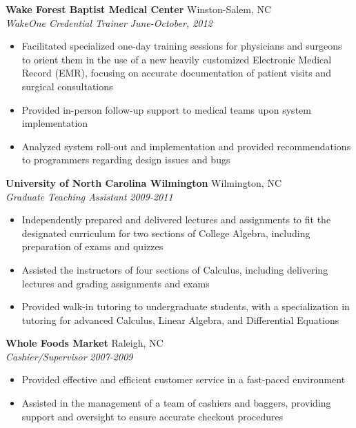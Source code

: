 \documentclass[10pt]{article}
\begin{document}
\noindent
{\bf Wake Forest Baptist Medical Center} \hfill Winston-Salem, NC\\
{\it WakeOne Credential Trainer} \hfill {\it June-October, 2012}

\begin{itemize}

\item Facilitated specialized one-day training sessions for physicians
and surgeons to orient them in the use of a new heavily customized Electronic
Medical Record (EMR), focusing on accurate documentation of patient visits
and surgical consultations

\item Provided in-person follow-up support to medical teams upon system
implementation

\item Analyzed system roll-out and implementation and provided
recommendations to programmers regarding design issues and bugs

\end{itemize}


\noindent
{\bf University of North Carolina Wilmington} \hfill Wilmington, NC\\
{\it Graduate Teaching Assistant} \hfill {\it 2009-2011}

\begin{itemize}

\item Independently prepared and delivered lectures and assignments to fit
the designated curriculum for two sections of College Algebra, including
preparation of exams and quizzes

\item Assisted the instructors of four sections of Calculus, including
delivering lectures and grading assignments and exams

\item	Provided walk-in tutoring to undergraduate students, with a
specialization in tutoring for advanced Calculus, Linear Algebra,
and Differential Equations

\end{itemize}


\noindent
{\bf Whole Foods Market} \hfill Raleigh, NC\\
{\it Cashier/Supervisor} \hfill {\it 2007-2009}

\begin{itemize}

\item Provided effective and efficient customer service in a fast-paced
environment

\item Assisted in the management of a team of cashiers and baggers, providing
support and oversight to ensure accurate checkout procedures

\end{itemize}
\end{document}
